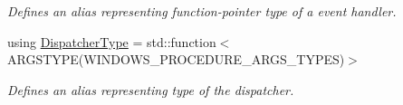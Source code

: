 \begin{DoxyCompactItemize}
\begin{DoxyCompactList}\small\item\em Defines an alias representing function-\/pointer type of a event handler. \end{DoxyCompactList}\item 
\hypertarget{classdl32_event_a052c4f4167153ed118fb53ff0e7d43a4}{using \hyperlink{classdl32_event_a052c4f4167153ed118fb53ff0e7d43a4}{Dispatcher\-Type} = std\-::function$<$ A\-R\-G\-S\-T\-Y\-P\-E(W\-I\-N\-D\-O\-W\-S\-\_\-\-P\-R\-O\-C\-E\-D\-U\-R\-E\-\_\-\-A\-R\-G\-S\-\_\-\-T\-Y\-P\-E\-S)$>$}\label{classdl32_event_a052c4f4167153ed118fb53ff0e7d43a4}

\begin{DoxyCompactList}\small\item\em Defines an alias representing type of the dispatcher. \end{DoxyCompactList}\end{DoxyCompactItemize}
